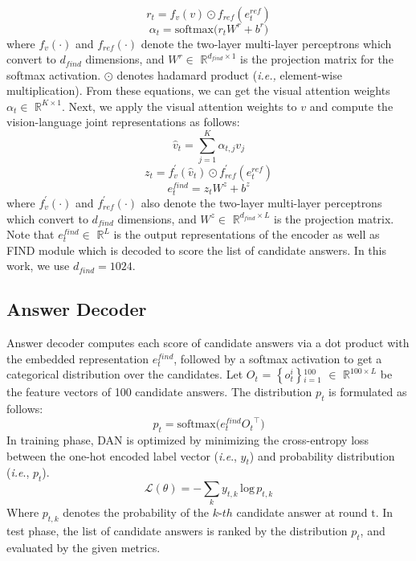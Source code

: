\documentclass[11pt,a4paper]{article}
\begin{document}
\begin{equation}
    {r_t} = f_{v}({v}) \odot f_{ref}({e^{ref}_t})  
\end{equation}
\begin{equation}
    \alpha_t = \mathrm{softmax(} {r_t}W^{r} + b^{r} \mathrm{)}  
\end{equation}
where $f_{v}(\cdot)$ and $f_{ref}(\cdot)$ denote the two-layer multi-layer perceptrons which convert to $d_{find}$ dimensions, and $W^r \in$ $\mathbb{R}^{d_{find} \times 1}$ is the projection matrix for the softmax activation. $\odot$ denotes hadamard product ({\it i.e.,} element-wise multiplication). From these equations, we can get the visual attention weights $\alpha_t \in$ $\mathbb{R}^{K \times 1}$. Next, we apply the visual attention weights to $v$ and compute the vision-language joint representations as follows:
\begin{equation}
    {\hat{v}_t} = \sum_{j=1}^K \alpha_{t, j} {v_j}  
\end{equation}
\begin{equation}
    {z_t} = f_{v}^{\prime}({\hat{v}_t}) \odot f_{ref}^{\prime}({e^{ref}_t})  
\end{equation}
\begin{equation}
    {e^{find}_t} = {z_t}W^{z} + b^{z}  
\end{equation}
where $f_{v}^{\prime}(\cdot)$ and $f_{ref}^{\prime}(\cdot)$ also denote the two-layer multi-layer perceptrons which convert to $d_{find}$ dimensions, and $W^z \in$ $\mathbb{R}^{d_{find} \times L}$ is the projection matrix. Note that $e^{find}_t \in$ $\mathbb{R}^{L}$ is the output representations of the encoder as well as FIND module which is decoded to score the list of candidate answers. In this work, we use $d_{find}=1024$. 

\subsection{Answer Decoder}
\label{sec:ansdec}
Answer decoder computes each score of candidate answers via a dot product with the embedded representation $e^{find}_t$, followed by a softmax activation to get a categorical distribution over the candidates. Let $O_t$ = {\it $\left\{o_{t}^i \right\}$$_{i=1}^{100}$} $\in$ $\mathbb{R}^{100 \times L}$ be the feature vectors of 100 candidate answers. The distribution $p_t$ is formulated as follows:
\begin{equation}
    {p_t} = \mathrm{softmax(} {e^{find}_t} {O_t}^\top \mathrm{)}  
\end{equation}
In training phase, DAN is optimized by minimizing the cross-entropy loss between the one-hot encoded label vector ({\it{i.e}}., $y_t$) and probability distribution ({\it{i.e}}., $p_t$).
\begin{equation}
    \mathcal{L}(\theta) = -\sum_{k} {y_{t, k}} \, \mathrm{log \,} {p_{t, k}}  
\end{equation}
Where $p_{t,k}$ denotes the probability of the $k$-$th$ candidate answer at round $\mathrm{t}$. In test phase, the list of candidate answers is ranked by the distribution $p_t$, and evaluated by the given metrics.
\end{document}
